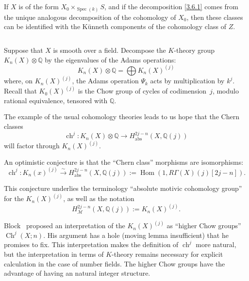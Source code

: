 \documentclass{article}
\theoremstyle{plain}
\theoremstyle{definition}
\newcommand{\sh}{\mathscr}
\newcommand{\QQ}{\mathbb{Q}}
\newcommand{\abs}{\mathrm{abs}}
\DeclareMathOperator{\Hom}{Hom}
\DeclareMathOperator{\Spec}{Spec}
\DeclareMathOperator{\ch}{ch}
\DeclareMathOperator{\Ch}{Ch}
\newcommand{\oldpage}[1]{\marginpar{\footnotesize$\Big\vert$ \textit{p.~#1}}}
\begin{document}
If $X$ is of the form $X_0\times_{\Spec(k)}S$, and if the decomposition \cref{3.6.1} comes from the unique analogous decomposition of the cohomology of $X_0$, then these classes can be identified with the K\"{u}nneth components of the cohomology class of $Z$.


\subsection{}
\label{3.7}

Suppose that $X$ is smooth over a field.
Decompose the $K$-theory group $K_n(X)\otimes\QQ$ by the eigenvalues of the Adams operations:
\[
  K_n(X)\otimes\QQ = \bigoplus K_n(X)^{(j)}
\]
where, on $K_n(X)^{(j)}$, the Adams operation $\Psi_k$ acts by multiplication by $k^j$.
Recall that $K_0(X)^{(j)}$ is the Chow group of cycles of codimension~$j$, modulo rational equivalence, tensored with $\QQ$.

The example of the usual cohomology theories leads to us hope that the Chern classes
\[
  \ch^j\colon K_n(X)\otimes\QQ \to H_\abs^{2j-n}(X,\QQ(j))
\]
will factor through $K_n(X)^{(j)}$.

An optimistic conjecture is that the ``Chern class'' morphisms are isomorphisms:
\[
\label{3.7.1}
  \ch^j\colon K_n(x)^{(j)} \xrightarrow{\sim} H_\abs^{2j-n}(X,\QQ(j)) := \Hom(1,R\Gamma(X)(j)[2j-n]).
\tag{3.7.1}
\]

\oldpage{158}
This conjecture underlies the terminology ``absolute motivic cohomology group'' for the $K_n(X)^{(j)}$, as well as the notation
\[
  H_\sh{M}^{2j-n}(X,\QQ(j)) := K_n(X)^{(j)}.
\]

Block~\cite{4} proposed an interpretation of the $K_n(X)^{(j)}$ as ``higher Chow groups'' $\Ch^j(X;n)$.
His argument has a hole (moving lemma insufficient) that he promises to fix.
This interpretation makes the definition of $\ch^j$ more natural, but the interpretation in terms of $K$-theory remains necessary for explicit calculation in the case of number fields.
The higher Chow groups have the advantage of having an natural integer structure.


\subsection{}
\label{3.8}
\end{document}
